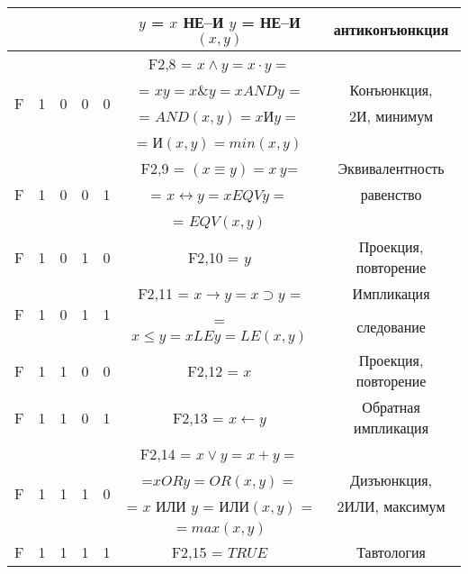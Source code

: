 \begin{table}[!h]
\begin{tabular}{|c|c|c|c|c|c|c|}
& & & & & $y$ = $x$ НЕ--И $y$ = НЕ--И$(x,y)$ & антиконъюнкция\\
\hline
& & & & & F2,8 = $x \wedge y = x \cdot y =$ &  \\
\multirow{2}{*}{F} & \multirow{2}{*}{1} & \multirow{2}{*}{0} & \multirow{2}{*}{0} & \multirow{2}{*}{0} &  = $xy = x \& y = x AND y$ = & Конъюнкция,\\
& & & & & = $AND(x,y) = x $И$ y =$ & 2И, минимум \\
& & & & & = И$(x,y) = min(x,y)$	& \\
\hline
& & & & & F2,9 = $(x \equiv y) = x ~ y $= & Эквивалентность \\
F & 1 & 0 & 0 & 1 & = $x \leftrightarrow y = x EQV y = $ & равенство\\
& & & & & = $EQV(x,y)$ & \\
\hline
\multirow{1}{*}{F} & \multirow{1}{*}{1} & \multirow{1}{*}{0} & \multirow{1}{*}{1} & \multirow{1}{*}{0} & F2,10 = $y $  & Проекция, повторение\\
\hline
\multirow{2}{*}{F} & \multirow{2}{*}{1} & \multirow{2}{*}{0} & \multirow{2}{*}{1} & \multirow{2}{*}{1} & F2,11 = $x \to y = x  \supset y$ = & Импликация \\
& & & & &  = $x \le y = x LE y = LE(x,y)$ & следование  \\
\hline
\multirow{1}{*}{F} & \multirow{1}{*}{1} & \multirow{1}{*}{1} & \multirow{1}{*}{0} & \multirow{1}{*}{0} & F2,12 = $x $  & Проекция, повторение\\
\hline
\multirow{1}{*}{F} & \multirow{1}{*}{1} & \multirow{1}{*}{1} & \multirow{1}{*}{0} & \multirow{1}{*}{1} & F2,13 = $x \leftarrow y $  & Обратная импликация\\
\hline
& & & & & F2,14 = $x \vee y = x + y =$ &  \\
\multirow{2}{*}{F} & \multirow{2}{*}{1} & \multirow{2}{*}{1} & \multirow{2}{*}{1} & \multirow{2}{*}{0} & =$ x OR y = OR(x,y) = $ & Дизъюнкция,\\
& & & & & = $x$ ИЛИ $y$ = ИЛИ$(x,y)$ = & 2ИЛИ, максимум \\
& & & & & $ = max(x,y)$	& \\
\hline
\multirow{1}{*}{F} & \multirow{1}{*}{1} & \multirow{1}{*}{1} & \multirow{1}{*}{1} & \multirow{1}{*}{1} & F2,15 = $TRUE $  & Тавтология\\
\hline
\end{tabular}

\end{table}
\newpage
